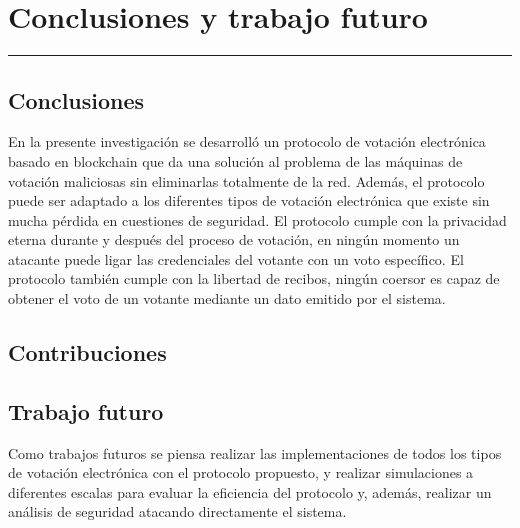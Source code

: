 \chapter{Conclusiones y trabajo futuro}
\hrule \bigskip \vspace*{1cm}

\section{Conclusiones}

En la presente investigación se desarrolló un protocolo de votación electrónica basado en blockchain que da una solución al problema de las máquinas de votación maliciosas sin eliminarlas totalmente de la red. Además, el protocolo puede ser adaptado a los diferentes tipos de votación electrónica que existe sin mucha pérdida en cuestiones de seguridad. El protocolo cumple con la privacidad eterna durante y después del proceso de votación, en ningún momento un atacante puede ligar las credenciales del votante con un voto específico. El protocolo también cumple con la libertad de recibos, ningún coersor es capaz de obtener el voto de un votante mediante un dato emitido por el sistema.


\section{Contribuciones}



\section{Trabajo futuro}

Como trabajos futuros se piensa realizar las implementaciones de todos los tipos de votación electrónica con el protocolo propuesto, y realizar simulaciones a diferentes escalas para evaluar la eficiencia del protocolo y, además, realizar un análisis de seguridad atacando directamente el sistema. 